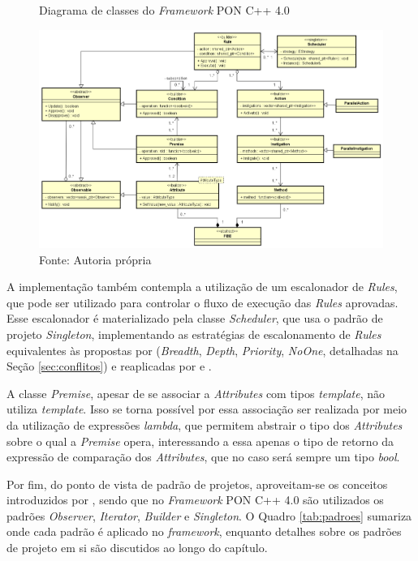 \begin{figure}[!htb]
    \centering
    \caption{Diagrama de classes do \textit{Framework} PON C++ 4.0}
    \includegraphics[width=\textwidth]{../figures/astah_nop4.png}
    \smallskip
    \caption*{Fonte: Autoria própria}
    \label{fig:class_fw4}
\end{figure}

\FloatBarrier

A implementação também contempla a utilização de um escalonador de
\textit{Rules}, que pode ser utilizado para controlar o fluxo de execução das
\textit{Rules} aprovadas. Esse escalonador é materializado pela classe
\textit{Scheduler}, que usa o padrão de projeto \textit{Singleton},
implementando as estratégias de escalonamento de \textit{Rules} equivalentes às
propostas por  (\textit{Breadth},
\textit{Depth}, \textit{Priority}, \textit{NoOne}, detalhadas na Seção
\ref{sec:conflitos}) e reaplicadas por  e
.

A classe \textit{Premise}, apesar de se associar a \textit{Attributes} com tipos
\textit{template}, não utiliza \textit{template}. Isso se torna possível por
essa associação ser realizada por meio da utilização de expressões
\textit{lambda}, que permitem abstrair o tipo dos \textit{Attributes} sobre o
qual a \textit{Premise} opera, interessando a essa apenas o tipo de retorno da
expressão de comparação dos \textit{Attributes}, que no caso será sempre um tipo
\textit{bool}.

Por fim, do ponto de vista de padrão de projetos, aproveitam-se os conceitos
introduzidos por , sendo que no \textit{Framework}
PON C++ 4.0 são utilizados os padrões \textit{Observer}, \textit{Iterator},
\textit{Builder} e \textit{Singleton}. O Quadro \ref{tab:padroes} sumariza onde
cada padrão é aplicado no \textit{framework}, enquanto detalhes sobre os padrões
de projeto em si são discutidos ao longo do capítulo.


